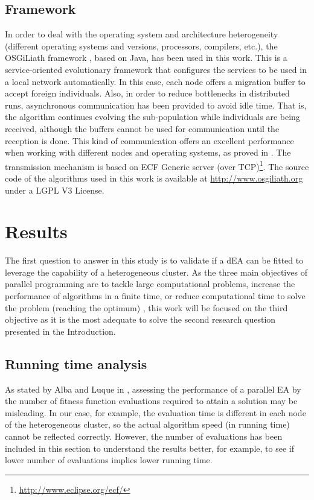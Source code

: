 \documentclass[final,1p,times]{elsarticle}
\begin{document}
\subsection{Framework}
In order to deal with the operating system and architecture heterogeneity (different operating systems and versions, processors, compilers, etc.), the OSGiLiath framework \cite{SOASOCO}, based on Java, has been used in this work. This is a service-oriented evolutionary framework that  configures the services to be used in a local network automatically. In this case, each node offers a migration buffer to accept foreign individuals. Also, in order to reduce bottlenecks in distributed runs, asynchronous communication has been provided to avoid idle time. That is, the algorithm continues evolving the sub-population while individuals are being received, although the buffers cannot be used for communication until the reception is done. This kind of communication offers an excellent performance when working with different nodes and operating systems, as proved in \cite{HETEROGENEOUSHARD,AsynchronousMerelo08}. The transmission mechanism is based on ECF Generic server (over TCP)\footnote{\url{http://www.eclipse.org/ecf/}}.  The source code of the algorithms used in this work is available at \url{http://www.osgiliath.org} under a LGPL V3 License. 


\section{Results}
\label{sec:results}



The first question to answer in this study is to validate if a dEA can 
be fitted to leverage the capability of a heterogeneous cluster. 
As the three main objectives of parallel programming are to tackle large
computational problems, increase the performance of algorithms in a
finite time, or reduce computational time to solve the problem
(reaching the optimum) \cite{EVALUATIONPARALLEL},  this work will be
focused on the third objective as it is the most adequate to solve the second research question presented in the Introduction. 


\subsection{Running time analysis}

As stated by Alba and Luque in \cite{EVALUATIONPARALLEL}, assessing
the performance of a parallel EA by the number of fitness function
evaluations required to attain a solution may be misleading. In our
case, for example, the evaluation time is different in each node of
the heterogeneous cluster, so the actual algorithm speed (in running
time) cannot be reflected correctly. However, the number of
evaluations has been included in this section to  understand the
results better, for example, to see if lower number of evaluations implies lower running time. 
\end{document}
